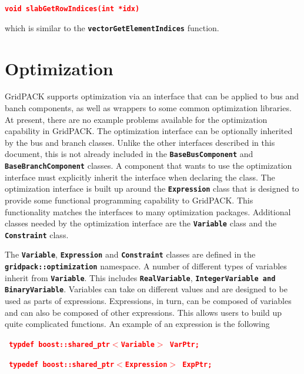 \documentclass[12pt]{report} %
\begin{document}
\textcolor{red}{\texttt{\textbf{void slabGetRowIndices(int *idx)}}}

which is similar to the \texttt{\textbf{vectorGetElementIndices}} function.

\chapter{Optimization}

GridPACK supports optimization via an interface that can be applied to bus and banch components, as well as wrappers to some common optimization libraries. At present, there are no example problems available for the optimization capability in GridPACK.
The optimization interface can be optionally inherited by the bus and branch classes. Unlike the other interfaces described in this document, this is not already included in the \texttt{\textbf{BaseBusComponent}} and \texttt{\textbf{BaseBranchComponent}} classes. A component that wants to use the optimization interface must explicitly inherit the interface when declaring the class. The optimization interface is built up around the \texttt{\textbf{Expression}} class that is designed to provide some functional programming capability to GridPACK. This functionality matches the interfaces to many optimization packages. Additional classes needed by the optimization interface are the \texttt{\textbf{Variable}} class and the \texttt{\textbf{Constraint}} class.

The \texttt{\textbf{Variable}}, \texttt{\textbf{Expression}} and \texttt{\textbf{Constraint}} classes are defined in the \texttt{\textbf{gridpack::optimization}} namespace. A number of different types of variables inherit from \texttt{\textbf{Variable}}. This includes \texttt{\textbf{RealVariable}}, \texttt{\textbf{IntegerVariable and BinaryVariable}}. Variables can take on different values and are designed to be used as parts of expressions. Expressions, in turn, can be composed of variables and can also be composed of other expressions. This allows users to build up quite complicated functions. An example of an expression is the following

\textcolor{red}{\texttt{\textbf{    typdef boost::shared\_ptr$\boldsymbol{\mathrm{<}}$Variable$\boldsymbol{\mathrm{>}}$ VarPtr;}}}

\textcolor{red}{\texttt{\textbf{    typedef boost::shared\_ptr$\boldsymbol{\mathrm{<}}$Expression$\boldsymbol{\mathrm{>}}$ ExpPtr;}}}

\textcolor{red}{\texttt{\textbf{}}}
\end{document}
